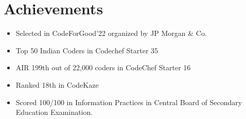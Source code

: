 \documentclass[letterpaper,11pt]{article}
\newcommand{\resumeItem}[1]{
  \item\small{
    {#1 \vspace{-2pt}}
  }
}
\newcommand{\resumeSubHeadingListStart}{\begin{itemize}[leftmargin=0.0in, label={}]}
\newcommand{\resumeSubHeadingListEnd}{\end{itemize}}
\newcommand{\resumeItemListStart}{\begin{itemize}}
\newcommand{\resumeItemListEnd}{\end{itemize}\vspace{-5pt}}
\begin{document}
\section{Achievements}
    \resumeSubHeadingListStart
        
        \resumeItemListStart
            \resumeItem{Selected in CodeForGood'22 organized by JP Morgan & Co.}
            \resumeItem{Top 50 Indian Coders in Codechef Starter 35}
            \resumeItem{AIR 199th out of 22,000 coders in CodeChef Starter 16}
            \resumeItem{Ranked 18th in CodeKaze}
            \resumeItem{Scored 100/100 in Information Practices in Central Board of Secondary Education Examination.}
        \resumeItemListEnd
        
    \resumeSubHeadingListEnd
\end{document}
